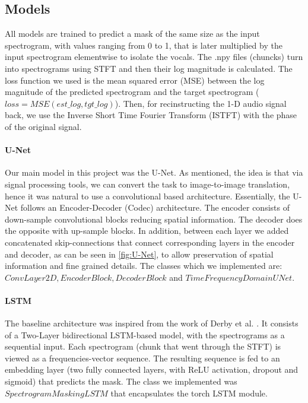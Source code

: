 \documentclass{article}
\begin{document}
\subsection{Models}
All models are trained to predict a mask of the same size as the input spectrogram, with values ranging from 0 to 1, that is later multiplied by the input spectrogram elementwise to isolate the vocals. The .npy files (chuncks) turn into spectrograms using STFT and then their log magnitude is calculated. The loss function we used is the mean squared error (MSE) between the log magnitude of the predicted spectrogram and the target spectrogram ($loss = MSE(est\_log, tgt\_log)$). Then, for recinstructing the 1-D audio signal back, we use the Inverse Short Time Fourier Transform (ISTFT) with the phase of the original signal.

\paragraph{U-Net}
Our main model in this project was the U-Net. As mentioned, the idea is that via signal processing tools, we can convert the task to image-to-image translation, hence it was natural to use a convolutional based architecture. Essentially, the U-Net follows an Encoder-Decoder (Codec) architecture. The encoder consists of down-sample convolutional blocks reducing spatial information. The decoder does the opposite with up-sample blocks. In addition, between each layer we added concatenated skip-connections that connect corresponding layers in the encoder and decoder, as can be seen in \cref{fig:U-Net}, to allow preservation of spatial information and fine grained details. The classes which we implemented are: $ConvLayer2D, EncoderBlock, DecoderBlock$ and $TimeFrequencyDomainUNet$.

\paragraph{LSTM}
The baseline architecture was inspired from the work of Derby et al. \cite{derby2024source}. It consists of a Two-Layer bidirectional LSTM-based model, with the spectrograms as a sequential input. Each spectrogram (chunk that went through the STFT) is viewed as a frequencies-vector sequence. The resulting sequence is fed to an embedding layer (two fully connected layers, with ReLU activation, dropout and sigmoid) that predicts the mask. The class we implemented was $SpectrogramMaskingLSTM$ that encapsulates the torch LSTM module.
\end{document}
